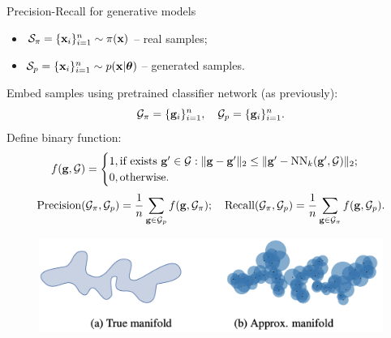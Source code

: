 \begin{frame}{Precision-Recall for generative models}
	\begin{itemize}
		\item $\mathcal{S}_{\pi} = \{\mathbf{x}_i\}_{i=1}^{n} \sim \pi(\mathbf{x})$ -- real samples;
		\item $\mathcal{S}_{p} = \{\mathbf{x}_i\}_{i=1}^{n} \sim p(\mathbf{x} | \boldsymbol{\theta})$ -- generated samples.
	\end{itemize}
	Embed samples using pretrained classifier network (as previously):
	\[
		\mathcal{G}_{\pi} = \{\mathbf{g}_i\}_{i=1}^n, \quad \mathcal{G}_{p} = \{\mathbf{g}_i\}_{i=1}^n.
	\]
	Define binary function:
	\[
		f(\mathbf{g}, \mathcal{G}) = 
		\begin{cases}
			1, \text{if exists } \mathbf{g}' \in \mathcal{G}: \| \mathbf{g}  - \mathbf{g}'\|_2 \leq \| \mathbf{g}' - \text{NN}_k(\mathbf{g}', \mathcal{G})\|_2; \\
			0, \text{otherwise.}
		\end{cases}
	\]
	\[
		\text{Precision} (\mathcal{G}_{\pi}, \mathcal{G}_{p}) = \frac{1}{n} \sum_{\mathbf{g} \in \mathcal{G}_{p}} f(\mathbf{g}, \mathcal{G}_{\pi}); \quad \text{Recall} (\mathcal{G}_{\pi}, \mathcal{G}_{p}) = \frac{1}{n} \sum_{\mathbf{g} \in \mathcal{G}_{\pi}} f(\mathbf{g}, \mathcal{G}_{p}).
	\]
	\vspace{-0.4cm}
	\begin{figure}
		\includegraphics[width=0.7\linewidth]{figs/pr_k_nearest}
	\end{figure}
\end{frame}
